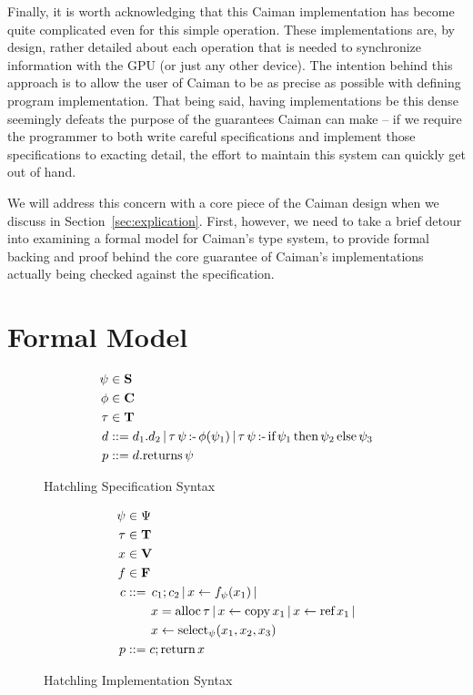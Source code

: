 Finally, it is worth acknowledging that this Caiman implementation has become quite complicated even for this simple operation.  These implementations are, by design, rather detailed about each operation that is needed to synchronize information with the GPU (or just any other device).  The intention behind this approach is to allow the user of Caiman to be as precise as possible with defining program implementation.  That being said, having implementations be this dense seemingly defeats the purpose of the guarantees Caiman can make -- if we require the programmer to both write careful specifications and implement those specifications to exacting detail, the effort to maintain this system can quickly get out of hand.

We will address this concern with a core piece of the Caiman design when we discuss in Section~\ref{sec:explication}.  First, however, we need to take a brief detour into examining a formal model for Caiman's type system, to provide formal backing and proof behind the core guarantee of Caiman's implementations actually being checked against the specification.

\section{Formal Model}
\label{sec:formal}

\begin{figure}
\begin{align*}
	\psi &\in \textbf{S}\\
	\phi &\in \textbf{C}\\
	\tau &\in \textbf{T} \\
    d &\mathrel{::=} d_1.d_2 \,|\,
        \tau\,\psi\,\textrm{:-}\, \phi(\psi_1) \,|\,
        \tau\,\psi\,\textrm{:-}\, \textrm{if}\, \psi_1 \,\textrm{then}\, \psi_2 \,\textrm{else}\, \psi_3 
        \\
    p &\mathrel{::=} d.\textrm{returns}\, \psi
\end{align*}
\caption{Hatchling Specification Syntax}
\label{fig:hatchspecsyntax}
\end{figure}

\begin{figure}
\begin{align*}
	\psi&\in \Psi\\
   	\tau&\in \textbf{T} \\
	x&\in \textbf{V}\\
	f&\in \textbf{F}\\
	c&\mathrel{::=} \,c_1 ; c_2 \,|\, 
        x\leftarrow f_\psi(x_1) \,|
        \\&\qquad
        x=\textrm{alloc}\,\tau \,|\,
        x\leftarrow\textrm{copy}\, x_1 \,|\, 
        x\leftarrow\textrm{ref}\, x_1 \,|
        \\&\qquad
        x\leftarrow\textrm{select}_{\psi} (x_1, x_2, x_3)\\
    p&\mathrel{::=} c;\textrm{return}\, x
\end{align*}
\caption{Hatchling Implementation Syntax}
\label{fig:hatchimplsyntax}
\end{figure}

